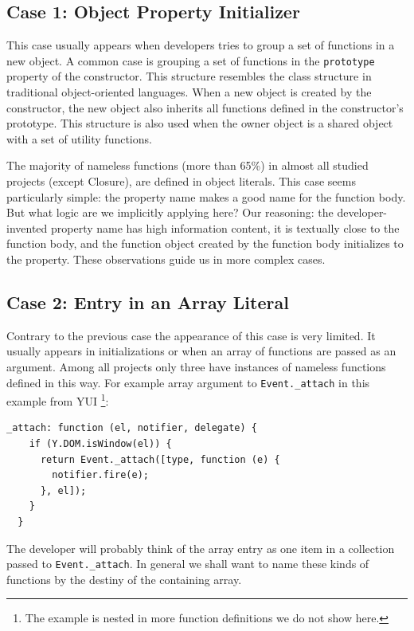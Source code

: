 \documentclass[10pt, preprint]{sigplanconf}
\begin{document}
\subsection{Case 1: Object Property Initializer}
 This case usually appears when developers tries to group a set of functions in a new object. A common case is grouping a set of functions in the \verb|prototype| property of the constructor. This structure resembles the class structure in traditional object-oriented languages. When a new object is created by the constructor, the new object also inherits all functions defined in the constructor's prototype. This structure is also used  when the owner object is a shared object with a set of utility functions.
  
The majority of nameless functions (more than 65\%) in almost all studied projects (except Closure), are defined in object literals. This case seems particularly simple: the property name makes a good name for the function body. But what logic are we implicitly applying here? Our reasoning: the developer-invented property name has high information content, it is textually close to the function body, and the function object created by the function body initializes to the property. These observations guide us in more complex cases.
 
\subsection{Case 2: Entry in an Array Literal}
\label{sec:arrayLiteral}
Contrary to the previous case the appearance of this case is very limited. It usually appears in initializations or when an array of functions are passed as an argument. Among all projects only three have instances of nameless functions defined in this way. For example array argument to \verb|Event._attach| in this example from YUI \footnote[3]{The example is nested in more function definitions we do not show here.}:
\lstset{basicstyle=\scriptsize}
\begin{lstlisting}[frame=single, language=myLang]
  _attach: function (el, notifier, delegate) {
    if (Y.DOM.isWindow(el)) {
      return Event._attach([type, function (e) {
        notifier.fire(e);
      }, el]);
    }
  }
\end{lstlisting}
The developer will probably think of the array entry as one item in a collection passed to \verb|Event._attach|. In general we shall want to name these kinds of functions by the destiny of the containing array.
\end{document}
